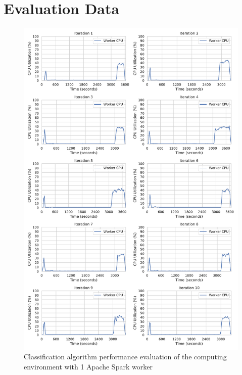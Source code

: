 \section{Evaluation Data}

\begin{figure}[h]
\centering
\includegraphics[scale=0.53]{images/07_evaluation/mortgage/mortgage_1_worker_cpu_performance}
\caption{Classification algorithm performance evaluation of the computing environment with 1 Apache Spark worker}
\label{fig:07_mortgage_static-cpu_results}
\end{figure}

